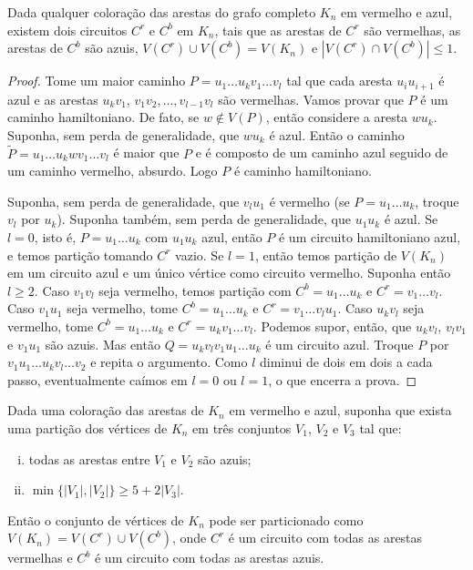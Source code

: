 \begin{lema}
	\label{lema:gyarfas}
	Dada qualquer coloração das arestas do grafo completo $K_n$ em vermelho e azul, existem dois circuitos $C^r$ e $C^b$ em $K_n$, tais que as arestas de $C^r$ são vermelhas, as arestas de $C^b$ são azuis, $V(C^r)\cup V(C^b) = V(K_n)$ e $|V(C^r)\cap V(C^b)|\leq1$.
\end{lema}

\begin{proof}
	Tome um maior caminho $P = u_1\dots u_kv_1\dots v_l$ tal que cada aresta $u_iu_{i+1}$ é azul e as arestas $u_kv_1$, $v_1v_2, \dots, v_{l-1}v_l$ são vermelhas. Vamos provar que $P$ é um caminho hamiltoniano. De fato, se $w\notin V(P)$, então considere a aresta $wu_k$. Suponha, sem perda de generalidade, que $wu_k$ é azul. Então o caminho $\tilde{P} = u_1\dots u_k w v_1\dots v_l$ é maior que $P$ e é composto de um caminho azul seguido de um caminho vermelho, absurdo. Logo $P$ é caminho hamiltoniano. 
	
	Suponha, sem perda de generalidade, que $v_lu_1$ é vermelho (se $P = u_1\dots u_k$, troque $v_l$ por $u_k$). Suponha também, sem perda de generalidade, que $u_1u_k$ é azul. Se $l=0$, isto é, $P=u_1\dots u_k$ com $u_1u_k$ azul, então $P$ é um circuito hamiltoniano azul, e temos partição tomando $C^r$ vazio. Se $l=1$, então temos partição de $V(K_n)$ em um circuito azul e um único vértice como circuito vermelho. Suponha então $l\geq2$. Caso $v_1v_l$ seja vermelho, temos partição com $C^b = u_1\dots u_k$ e $C^r = v_1\dots v_l$. Caso $v_1u_1$ seja vermelho, tome $C^b = u_1\dots u_k$ e $C^r = v_1\dots v_lu_1$. Caso $u_kv_l$ seja vermelho, tome $C^b = u_1\dots u_k$ e $C^r = u_kv_1\dots v_l$. Podemos supor, então, que $u_kv_l$, $v_lv_1$ e $v_1u_1$ são azuis. Mas então $Q = u_kv_lv_1u_1\dots u_k$ é um circuito azul. Troque $P$ por $v_1u_1\dots u_kv_l\dots v_2$ e repita o argumento. Como $l$ diminui de dois em dois a cada passo, eventualmente caímos em $l=0$ ou $l=1$, o que encerra a prova.
\end{proof}

\begin{lema}
	\label{lema:bipartido_azul}
	Dada uma coloração das arestas de $K_n$ em vermelho e azul, suponha que exista uma partição dos vértices de $K_n$ em três conjuntos $V_1$, $V_2$ e $V_3$ tal que:
	\begin{enumerate}[(i)]
		\item todas as arestas entre $V_1$ e $V_2$ são azuis;
		\item $\min\{|V_1|, |V_2|\}\geq 5 + 2|V_3|$.
	\end{enumerate}
	Então o conjunto de vértices de $K_n$ pode ser particionado como $V(K_n) = V(C^r)\cup V(C^b)$, onde $C^r$ é um circuito com todas as arestas vermelhas e $C^b$ é um circuito com todas as arestas azuis.
\end{lema}

